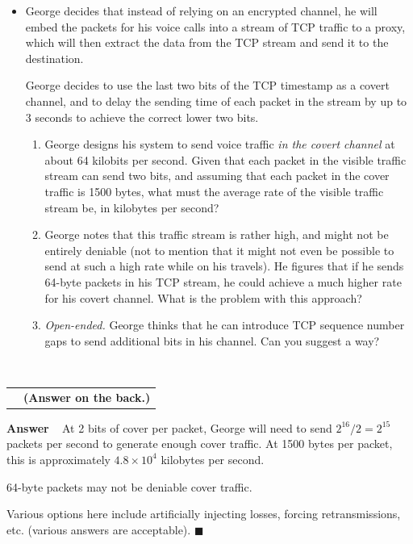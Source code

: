 \documentclass[11pt]{article}
\newcounter{pctr}
\newcommand{\sols}[1]{#1}
\newcommand{\sols}[1]{}
\newcounter{answer}
\newenvironment{answer}[1][\relax]{\refstepcounter{answer}\begin{list}%
 {}{\leftmargin 0pt\rightmargin 0pt\labelsep 3pt\parsep 0pt%
 \setlength{\listparindent}{\parindent}}
    \item {\bf Answer \theanswer #1}\
    }{\hspace*{\fill}$\blacksquare$\end{list}}
\newcommand\prob[1]%
  {\begin{itemize}\item[]%
   \vspace{.2in}{\bf\thepctr. ~[#1~ points]:}\stepcounter{pctr}}
\newcommand\eprob{\end{itemize}}
\newcommand\probnote[1]%
  {\\\begin{tabular}{cr} \hspace{3in} & {\bf (#1)} \\ \end{tabular}}
\begin{document}
\prob{8} George decides that instead of relying on an encrypted channel,
he will embed the packets for his voice calls into a stream of TCP
traffic to a proxy, which will then extract the data from the TCP
stream and send it to the destination.  

George decides to use the last two bits of the TCP timestamp as a covert
channel, and to delay the sending time of each packet in the stream by
up to 3 seconds to achieve the correct lower two bits.

\begin{enumerate}
\item George designs his system to send voice traffic {\em in the covert
  channel} at about 64 kilobits per second.  Given that each packet in
  the visible traffic stream can send two bits, and assuming that each
  packet in the cover traffic is 1500 bytes, what must the average rate
  of the visible traffic stream be, in kilobytes per second?
\item George notes that this traffic stream is rather high, and might
  not be entirely deniable (not to mention that it might not even be
  possible to send at such a high rate while on his travels).  He
  figures that if he sends 64-byte packets in his TCP stream, he could
  achieve a much higher rate for his covert channel.  What is the
  problem with this approach?
\item {\em Open-ended.} George thinks that he can introduce TCP sequence
  number gaps to send additional bits in his channel.  Can you suggest a
  way?
\end{enumerate}

\eprob
~\probnote{Answer on the back.}
\vspace*{1.5in}

\sols{
\vspace{-1.25in}
\begin{answer}
At 2 bits of cover per packet, George will need to send $2^{16}/2 =
2^{15}$ packets per second to generate enough cover traffic.  At 1500
bytes per packet, this is approximately $4.8 \times 10^4$ kilobytes per
second. 

64-byte packets may not be deniable cover traffic.

Various options here include artificially injecting losses, forcing
retransmissions, etc. (various answers are acceptable).
\end{answer}
}



\label{lastpage}
\end{document}
